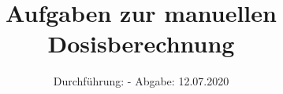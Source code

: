 

\subject{TPS Praktikum}
\title{Aufgaben zur manuellen Dosisberechnung}
\date{%
	Durchführung: -
	\hspace{3em}
	Abgabe: 12.07.2020
}


	
	\maketitle
	\thispagestyle{empty}
	\tableofcontents
	\newpage
	\setlength{\parindent}{0em}
	
	

	
	
	\newpage
	\printbibliography{}
	\nocite{*}
	
	

